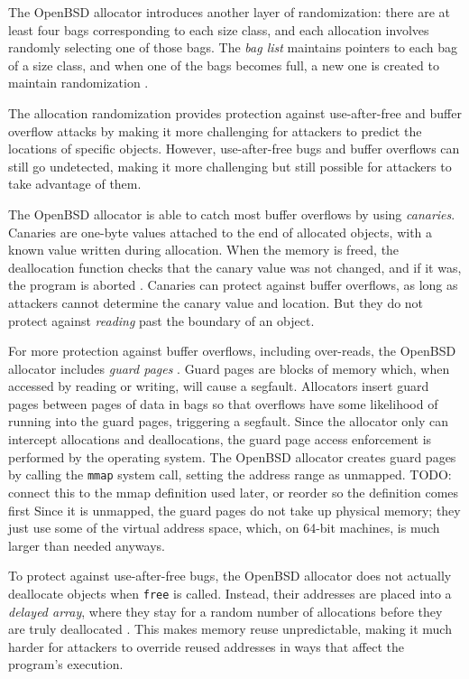 \documentclass[conference]{IEEEtran}
\begin{document}
The OpenBSD allocator introduces another layer of randomization: there are at least four bags corresponding to each size class, and each allocation involves randomly selecting one of those bags.
The \emph{bag list} maintains pointers to each bag of a size class, and when one of the bags becomes full, a new one is created to maintain randomization \cite{freeguard}.

The allocation randomization provides protection against use-after-free and buffer overflow attacks by making it more challenging for attackers to predict the locations of specific objects.
However, use-after-free bugs and buffer overflows can still go undetected, making it more challenging but still possible for attackers to take advantage of them.

The OpenBSD allocator is able to catch most buffer overflows by using \emph{canaries}.
Canaries are one-byte values attached to the end of allocated objects, with a known value written during allocation.
When the memory is freed, the deallocation function checks that the canary value was not changed, and if it was, the program is aborted \cite{openbsd_man_page}.
Canaries can protect against buffer overflows, as long as attackers cannot determine the canary value and location.
But they do not protect against \emph{reading} past the boundary of an object.

For more protection against buffer overflows, including over-reads, the OpenBSD allocator includes \emph{guard pages} \cite{openbsd_man_page}.
Guard pages are blocks of memory which, when accessed by reading or writing, will cause a segfault.
Allocators insert guard pages between pages of data in bags so that overflows have some likelihood of running into the guard pages, triggering a segfault.
Since the allocator only can intercept allocations and deallocations, the guard page access enforcement is performed by the operating system.
The OpenBSD allocator creates guard pages by calling the \verb|mmap| system call, setting the address range as unmapped.
	{\color{red} TODO: connect this to the mmap definition used later, or reorder so the definition comes first}
Since it is unmapped, the guard pages do not take up physical memory; they just use some of the virtual address space, which, on 64-bit machines, is much larger than needed anyways.

To protect against use-after-free bugs, the OpenBSD allocator does not actually deallocate objects when \verb|free| is called.
Instead, their addresses are placed into a \emph{delayed array}, where they stay for a random number of allocations before they are truly deallocated \cite{freeguard}.
This makes memory reuse unpredictable, making it much harder for attackers to override reused addresses in ways that affect the program's execution.
\end{document}
